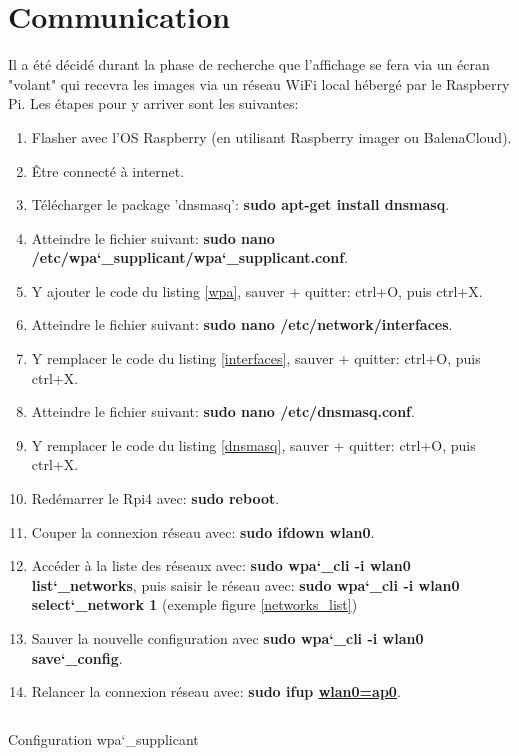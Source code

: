 \section{Communication}
Il a été décidé durant la phase de recherche que l'affichage se fera via un écran "volant" qui recevra les images via un réseau WiFi local
hébergé par le Raspberry Pi. Les étapes pour y arriver sont les suivantes:
\begin{enumerate}
    \item Flasher avec l'OS Raspberry (en utilisant Raspberry imager ou BalenaCloud).
    \item Être connecté à internet.
    \item Télécharger le package 'dnsmasq': \textbf{sudo apt-get install dnsmasq}.
    \item Atteindre le fichier suivant: \textbf{sudo nano /etc/wpa\char`_supplicant/wpa\char`_supplicant.conf}.
    \item Y ajouter le code du listing \ref{wpa}, sauver + quitter: ctrl+O, puis ctrl+X.
    \item Atteindre le fichier suivant: \textbf{sudo nano /etc/network/interfaces}.
    \item Y remplacer le code du listing \ref{interfaces}, sauver + quitter: ctrl+O, puis ctrl+X.
    \item Atteindre le fichier suivant: \textbf{sudo nano /etc/dnsmasq.conf}.
    \item Y remplacer le code du listing \ref{dnsmasq}, sauver + quitter: ctrl+O, puis ctrl+X.
    \item Redémarrer le Rpi4 avec: \textbf{sudo reboot}.
    \item Couper la connexion réseau avec: \textbf{sudo ifdown wlan0}.
    \item Accéder à la liste des réseaux avec: \textbf{sudo wpa\char`_cli -i wlan0 list\char`_networks}, puis saisir le réseau avec: \textbf{sudo wpa\char`_cli -i wlan0 select\char`_network 1} (exemple figure \ref{networks_list})
    \item Sauver la nouvelle configuration avec \textbf{sudo wpa\char`_cli -i wlan0 save\char`_config}.
    \item Relancer la connexion réseau avec: \textbf{sudo ifup \underline{wlan0=ap0}}.
\end{enumerate}
\begin{listing}[ht]
    \inputminted{makefile}{assets/figures/wpa_supplicant.make}
    \caption{Configuration wpa\char`_supplicant \label{wpa}}
\end{listing}


